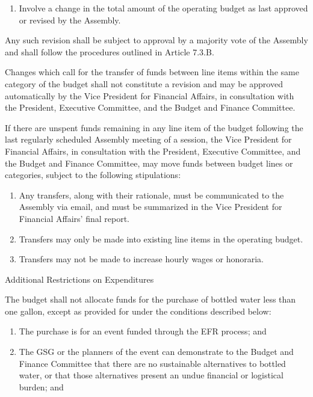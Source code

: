 \begin{bylaws-number}
\begin{bylaws-number}
\begin{enumerate}[i]
      \item Involve a change in the total amount of the operating budget as last approved or revised by the Assembly.
    \end{enumerate}
    \item Any such revision shall be subject to approval by a majority vote of the Assembly and shall follow the procedures outlined in Article 7.3.B.
    \item Changes which call for the transfer of funds between line items within the same category of the budget shall not constitute a revision and may be approved automatically by the Vice President for Financial Affairs, in consultation with the President, Executive Committee, and the Budget and Finance Committee.
    \item If there are unspent funds remaining in any line item of the budget following the last regularly scheduled Assembly meeting of a session, the Vice President for Financial Affairs, in consultation with the President, Executive Committee, and the Budget and Finance Committee, may move funds between budget lines or categories, subject to the following stipulations:
    \begin{enumerate}[i]
      \item Any transfers, along with their rationale, must be communicated to the Assembly via email, and must be summarized in the Vice President for Financial Affairs’ final report.
      \item Transfers may only be made into existing line items in the operating budget.
      \item Transfers may not be made to increase hourly wages or honoraria.
    \end{enumerate}
  \end{bylaws-number}
  \item Additional Restrictions on Expenditures
  \begin{bylaws-number}
    \item The budget shall not allocate funds for the purchase of bottled water less than one gallon, except as provided for under the conditions described below:
    \begin{enumerate}[i]
      \item The purchase is for an event funded through the EFR process; and
      \item The GSG or the planners of the event can demonstrate to the Budget and Finance Committee that there are no sustainable alternatives to bottled water, or that those alternatives present an undue financial or logistical burden; and

\end{enumerate}
\end{bylaws-number}
\end{bylaws-number}
